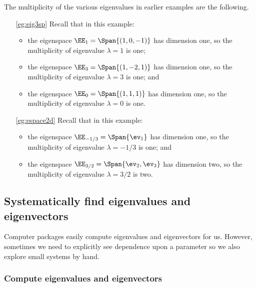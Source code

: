 \begin{example} \label{eg:}
The multiplicity of the various eigenvalues in earlier examples are the following.
\begin{itemize}
\item[\ref{eg:eig3sp}] Recall that in this example:
\begin{itemize}
\item the eigenspace \(\EE_1=\Span\{(1,0,-1)\}\) has dimension one, so the multiplicity of eigenvalue \(\lambda=1\) is one;
\item the eigenspace \(\EE_3=\Span\{(1,-2,1)\}\) has dimension one, so the multiplicity of eigenvalue \(\lambda=3\) is one; and
\item the eigenspace \(\EE_0=\Span\{(1,1,1)\}\) has dimension one, so the multiplicity of eigenvalue \(\lambda=0\) is one.
\end{itemize}

\item[\ref{eg:espace2d}] Recall that in this example: 
\begin{itemize}
\item the eigenspace \(\EE_{-1/3}=\Span\{\ev_1\}\) has dimension one, so the multiplicity of eigenvalue \(\lambda=-1/3\) is one; and
\item the eigenspace \(\EE_{3/2}=\Span\{\ev_2,\ev_3\}\) has dimension two, so the multiplicity of eigenvalue \(\lambda=3/2\) is two.
\end{itemize}

\end{itemize}
\end{example}














\subsection{Systematically find eigenvalues and eigenvectors}

Computer packages easily compute eigenvalues and eigenvectors for us.
However, sometimes we need to explicitly see dependence upon a parameter so we also explore small systems by hand.

\subsubsection{Compute eigenvalues and eigenvectors}
\label{sec:cee}

